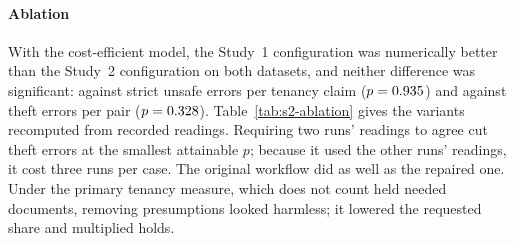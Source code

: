 \paragraph{Ablation}
With the cost-efficient model, the Study~1 configuration was numerically better than the Study~2 configuration on both datasets, and neither difference was significant: \stSecAblationTenancyCPvBVsCPvCpLunaA{} against \stSecAblationTenancyCPvBVsCPvCpLunaB{} strict unsafe errors per tenancy claim ($p=0.935$) and \stSecAblationTheftCPvBVsCPvCpLunaA{} against \stSecAblationTheftCPvBVsCPvCpLunaB{} theft errors per pair ($p=0.328$). Table~\ref{tab:s2-ablation} gives the variants recomputed from recorded readings. Requiring two runs' readings to agree cut theft errors at the smallest attainable $p$; because it used the other runs' readings, it cost three runs per case. The original workflow did as well as the repaired one. Under the primary tenancy measure, which does not count held needed documents, removing presumptions looked harmless; it lowered the requested share and multiplied holds.

